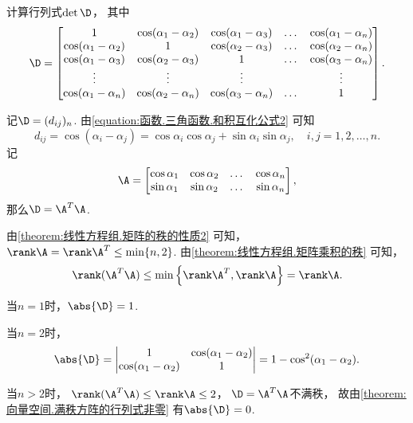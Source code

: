 \begin{example}
计算行列式\(\det\D\)，
其中\[
	\D = \begin{bmatrix}
		1 & \cos(\alpha_1-\alpha_2) & \cos(\alpha_1-\alpha_3) & \dots & \cos(\alpha_1-\alpha_n) \\
		\cos(\alpha_1-\alpha_2) & 1 & \cos(\alpha_2-\alpha_3) & \dots & \cos(\alpha_2-\alpha_n) \\
		\cos(\alpha_1-\alpha_3) & \cos(\alpha_2-\alpha_3) & 1 & \dots & \cos(\alpha_3-\alpha_n) \\
		\vdots & \vdots & \vdots & & \vdots \\
		\cos(\alpha_1-\alpha_n) & \cos(\alpha_2-\alpha_n) & \cos(\alpha_3-\alpha_n) & \dots & 1
	\end{bmatrix}.
\]
\begin{solution}
记\(\D = (d_{ij})_n\).
由\cref{equation:函数.三角函数.和积互化公式2} 可知\[
	d_{ij} = \cos(\alpha_i-\alpha_j)
	= \cos\alpha_i\cos\alpha_j+\sin\alpha_i\sin\alpha_j,
	\quad i,j=1,2,\dotsc,n.
\]
记\[
	\A = \begin{bmatrix}
		\cos\alpha_1 & \cos\alpha_2 & \dots & \cos\alpha_n \\
		\sin\alpha_1 & \sin\alpha_2 & \dots & \sin\alpha_n
	\end{bmatrix},
\]那么\(\D = \A^T \A\).

由\cref{theorem:线性方程组.矩阵的秩的性质2} 可知，
\(\rank\A = \rank\A^T \leq \min\{n,2\}\).
由\cref{theorem:线性方程组.矩阵乘积的秩} 可知，\[
	\rank(\A^T\A) \leq \min\left\{\rank\A^T,\rank\A\right\} = \rank\A.
\]

当\(n=1\)时，\(\abs{\D}=1\).

当\(n=2\)时，\[
	\abs{\D}
	= \begin{vmatrix}
		1 & \cos(\alpha_1-\alpha_2) \\
		\cos(\alpha_1-\alpha_2) & 1
	\end{vmatrix}
	= 1 - \cos^2(\alpha_1-\alpha_2).
\]

当\(n>2\)时，
\(\rank(\A^T\A) \leq \rank\A \leq2\)，
\(\D = \A^T \A\)不满秩，
故由\cref{theorem:向量空间.满秩方阵的行列式非零} 有\(\abs{\D}=0\).
\end{solution}
\end{example}


